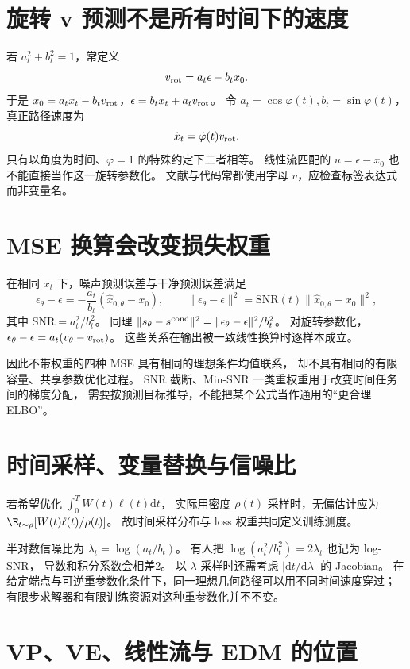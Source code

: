 \section{旋转 v 预测不是所有时间下的速度}

若 $a_t^2+b_t^2=1$，常定义
\[
v_{\rm rot}=a_t\epsilon-b_tx_0.
\]
于是 $x_0=a_tx_t-b_tv_{\rm rot}$，$\epsilon=b_tx_t+a_tv_{\rm rot}$。
令 $a_t=\cos\varphi(t),b_t=\sin\varphi(t)$，真正路径速度为
\begin{equation}\label{th:rot-v}
\dot x_t=\dot\varphi(t)v_{\rm rot}.
\end{equation}
只有以角度为时间、$\dot\varphi=1$ 的特殊约定下二者相等。
线性流匹配的 $u=\epsilon-x_0$ 也不能直接当作这一旋转参数化。
文献与代码常都使用字母 $v$，应检查标签表达式而非变量名。

\section{MSE 换算会改变损失权重}

在相同 $x_t$ 下，噪声预测误差与干净预测误差满足
\[
\epsilon_\theta-\epsilon=-\frac{a_t}{b_t}(\hat x_{0,\theta}-x_0),\qquad
\|\epsilon_\theta-\epsilon\|^2
=\mathrm{SNR}(t)\|\hat x_{0,\theta}-x_0\|^2,
\]
其中 $\mathrm{SNR}=a_t^2/b_t^2$。
同理 $\|s_\theta-s^{\rm cond}\|^2=\|\epsilon_\theta-\epsilon\|^2/b_t^2$。
对旋转参数化，$\epsilon_\theta-\epsilon=a_t(v_\theta-v_{\rm rot})$。
这些关系在输出被一致线性换算时逐样本成立。

因此不带权重的四种 MSE 具有相同的理想条件均值联系，
却不具有相同的有限容量、共享参数优化过程。
SNR 截断、Min-SNR 一类重权重用于改变时间任务间的梯度分配，
需要按预测目标推导，不能把某个公式当作通用的“更合理 ELBO”。

\section{时间采样、变量替换与信噪比}

若希望优化 $\int_0^T W(t)\ell(t)\mathrm dt$，
实际用密度 $\rho(t)$ 采样时，无偏估计应为
$\E_{t\sim\rho}[W(t)\ell(t)/\rho(t)]$。
故时间采样分布与 loss 权重共同定义训练测度。

半对数信噪比为 $\lambda_t=\log(a_t/b_t)$。
有人把 $\log(a_t^2/b_t^2)=2\lambda_t$ 也记为 log-SNR，
导数和积分系数会相差2。
以 $\lambda$ 采样时还需考虑 $|\mathrm dt/\mathrm d\lambda|$ 的 Jacobian。
在给定端点与可逆重参数化条件下，同一理想几何路径可以用不同时间速度穿过；
有限步求解器和有限训练资源对这种重参数化并不不变。

\section{VP、VE、线性流与 EDM 的位置}

